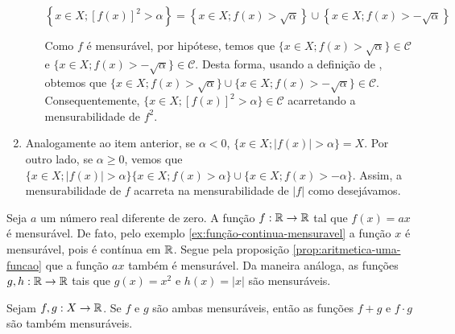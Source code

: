 \begin{prova}
\begin{enumerate}[label*=(\alph*)]
\begin{enumerate}[label = (\roman*)]
                $$\left\{x \in X; [f(x)]^2 > \alpha\right\} = \left\{x \in X; f(x)> \sqrt{\alpha}\right\}\cup \left\{x \in X; f(x)> -\sqrt{\alpha}\right\}$$
                
                Como $f$ é mensurável, por hipótese, temos que $\{x \in X; f(x)> \sqrt{\alpha}\} \in \mathcal{C}$ e \linebreak $\{x \in X; f(x)> -\sqrt{\alpha}\} \in \mathcal{C}$.
                Desta forma, usando a definição de \sigal, obtemos que  $\{x \in X; f(x)> \sqrt{\alpha}\} \cup \{x \in X; f(x)> -\sqrt{\alpha}\} \in \mathcal{C}$. Consequentemente, 
                $\{x \in X; [f(x)]^2 > \alpha\} \in \mathcal{C}$ acarretando a mensurabilidade de $f^2$.
            \end{enumerate}
            
        \item Analogamente ao item anterior, se $\alpha < 0$, $\{x \in X; |f(x)| > \alpha\} = X$.
        Por outro lado, se $\alpha \geq 0$, vemos que 
        $\{x \in X; |f(x)| > \alpha\}\{x \in X; f(x)> \alpha\} \cup \{x \in X; f(x)> -\alpha\}$.
        Assim, a mensurabilidade de $f$ acarreta na mensurabilidade de $|f|$ como desejávamos.
    \end{enumerate}
\end{prova}

\begin{example}
\label{ex:funcao-afim-mensuravel}
    Seja $a$ um número real diferente de zero. 
    A função $f: \mathbb{R} \to \mathbb{R}$ tal que $f(x) = ax$ é mensurável.
    De fato, pelo exemplo \ref{ex:função-continua-mensuravel} a função $x$ é mensurável, pois é contínua em $\mathbb{R}$.
    Segue pela proposição \ref{prop:aritmetica-uma-funcao} que a função $ax$ também é mensurável.
    Da maneira análoga, as funções $g,h: \mathbb{R} \to \mathbb{R}$ tais que $g(x) = x^2$ e $h(x) = |x|$ são mensuráveis.
\end{example}



\begin{proposition}
\label{prop:aritmetica-duas-funcoes}
    Sejam $f,g:X \to \mathbb{R}$. Se $f$ e $g$ são ambas mensuráveis, então as funções $f+g$ e $f\cdot g$ são também mensuráveis.
\end{proposition}

